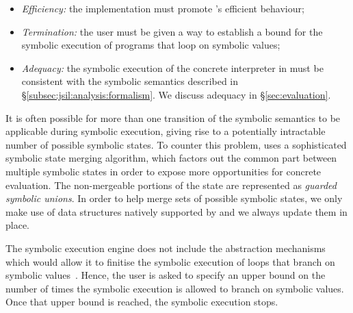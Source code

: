 \begin{itemize}          
   \item \emph{Efficiency:} the implementation must promote \rosette's efficient behaviour;
   
   \item \emph{Termination:} the user must be given a way to establish a bound for the symbolic execution 
            of programs that loop on symbolic values; 
  
   \item \emph{Adequacy:} the symbolic execution of the concrete interpreter in \rosette 
            must be consistent with the symbolic semantics described in \S\ref{subsec:jsil:analysis:formalism}. 
            We discuss adequacy in \S\ref{sec:evaluation}. 
\end{itemize}

It is often possible for more than one transition of the symbolic 
semantics to be applicable during symbolic execution, 
giving rise to a potentially intractable number of possible symbolic states. 
To counter this problem, \rosette uses a sophisticated 
symbolic state merging algorithm, which factors out the common 
part between multiple symbolic states  in order to expose more 
opportunities for concrete evaluation. The non-mergeable portions of the state 
are represented as \emph{guarded symbolic unions}. 
In order to help
\rosette merge sets of possible symbolic states, we only make use of 
data structures natively supported by \rosette and we always update them 
in place. 

 The \jsil symbolic execution engine does not 
include the abstraction mechanisms which would allow it to finitise the symbolic 
execution of loops that branch on symbolic values~\cite{abstract:symbolic:exec}. 
Hence, the user is asked to specify an upper bound on the number of times
the symbolic execution is allowed to branch on symbolic values.
Once that upper bound is reached, the symbolic execution stops.  




